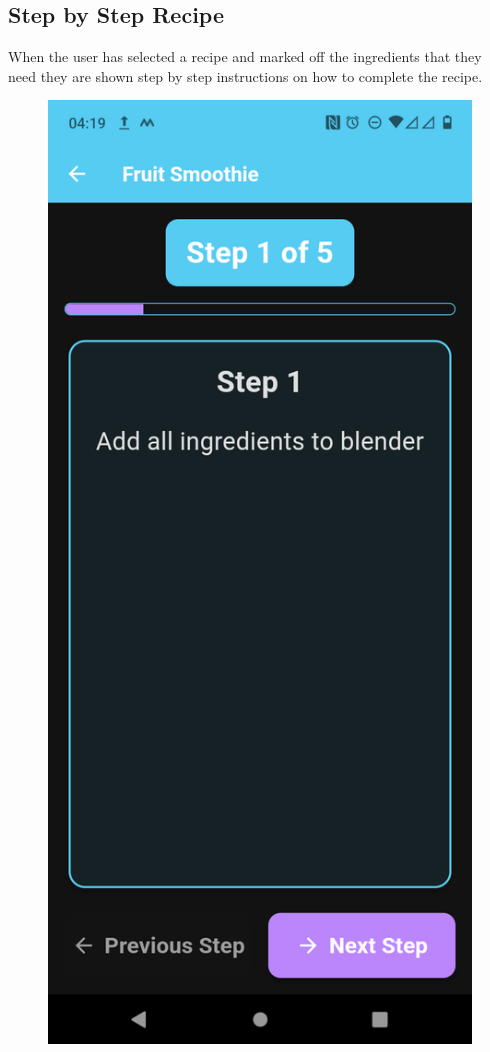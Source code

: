 \documentclass[]{project_final}
\begin{document}
\subsection{Step by Step Recipe}
When the user has selected a recipe and marked off the ingredients that they need they are shown step by step instructions on how to complete the recipe.
\begin{figure}[ht!]
  \centering
  \begin{minipage}[t]{0.4\textwidth}
    \includegraphics[height=0.5\textheight]{STEP1.png}

\end{minipage}
\end{figure}
\end{document}
